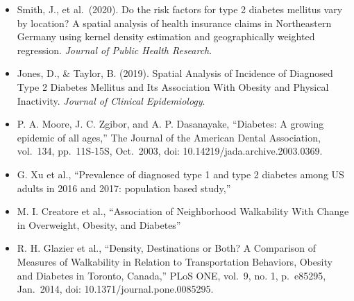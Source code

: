 \documentclass[
]{article}
\providecommand{\tightlist}{%
  \setlength{\itemsep}{0pt}\setlength{\parskip}{0pt}}\usepackage{longtable,booktabs,array}
\begin{document}
\begin{itemize}
\tightlist
\item
  Smith, J., et al.~(2020). Do the risk factors for type 2 diabetes
  mellitus vary by location? A spatial analysis of health insurance
  claims in Northeastern Germany using kernel density estimation and
  geographically weighted regression. \emph{Journal of Public Health
  Research}.
\item
  Jones, D., \& Taylor, B. (2019). Spatial Analysis of Incidence of
  Diagnosed Type 2 Diabetes Mellitus and Its Association With Obesity
  and Physical Inactivity. \emph{Journal of Clinical Epidemiology}.
\item
  P. A. Moore, J. C. Zgibor, and A. P. Dasanayake, ``Diabetes: A growing
  epidemic of all ages,'' The Journal of the American Dental
  Association, vol.~134, pp.~11S-15S, Oct.~2003, doi:
  10.14219/jada.archive.2003.0369.
\item
  G. Xu et al., ``Prevalence of diagnosed type 1 and type 2 diabetes
  among US adults in 2016 and 2017: population based study,''
\item
  M. I. Creatore et al., ``Association of Neighborhood Walkability With
  Change in Overweight, Obesity, and Diabetes''
\item
  R. H. Glazier et al., ``Density, Destinations or Both? A Comparison of
  Measures of Walkability in Relation to Transportation Behaviors,
  Obesity and Diabetes in Toronto, Canada,'' PLoS ONE, vol.~9, no. 1,
  p.~e85295, Jan.~2014, doi: 10.1371/journal.pone.0085295.
\end{itemize}
\end{document}

